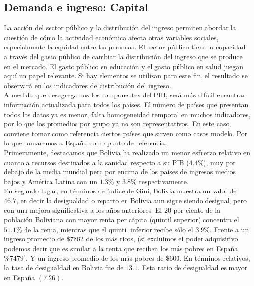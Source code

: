     \subsection{Demanda e ingreso: Capital}
    La acción del sector público y la distribución del ingreso permiten abordar la cuestión de cómo la actividad económica afecta otras variables sociales, especialmente la equidad entre las personas. El sector público tiene la capacidad a través del gasto público de cambiar la distribución del ingreso que se produce en el mercado. El gasto público en educación y el gasto público en salud juegan aquí un papel relevante. Si hay elementos se utilizan para este fin, el resultado se observará en los indicadores de distribución del ingreso.\\
    A medida que desagregamos los componentes del PIB, será más difícil encontrar información actualizada para todos los países. El número de países que presentan todos los datos ya es menor, falta homogeneidad temporal en muchos indicadores, por lo que los promedios por grupo ya no son representativos. En este caso, conviene tomar como referencia ciertos países que sirven como casos modelo. Por lo que tomaremos a España como punto de referencia.\\
    Primeramente, destacamos que Bolivia ha realizado un menor esfuerzo relativo en cuanto a recursos destinados a la sanidad respecto a su PIB ($4.4 \%$), muy por debajo de la media mundial pero por encima de los países de ingresos medios bajos y América Latina con un $1.3\%$ y $3.8\%$ respectivamente.\\
    En segundo lugar, en términos de índice de Gini, Bolivia muestra un valor de $46.7$, en decir la desigualdad o reparto en Bolivia aun sigue siendo desigual, pero con una mejora significativa a los años anteriores. El $20$ por ciento de la población Boliviana con mayor renta per cápita (quintil superior) concentra el $51.1 \%$ de la renta, mientras que el quintil inferior recibe sólo el $3.9 \%$. Frente a un ingreso promedio de $\$7862$ de los más ricos, (si excluimos el poder adquisitivo podemos decir que es similar a la renta que reciben los más pobres en España $\% 7479$). Y un ingreso promedio de los más pobres de $\$ 600$. En términos relativos, la tasa de desigualdad en Bolivia fue de $13.1$. Esta ratio de desigualdad es mayor en España $(7.26)$. 
    
